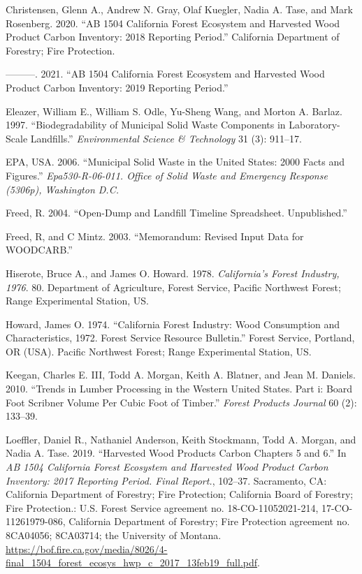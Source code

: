 \documentclass[
  openany]{book}
\newlength{\cslhangindent}
\newlength{\cslentryspacingunit} %
\newenvironment{CSLReferences}[2] %
 {%
  \setlength{\parindent}{0pt}
  \ifodd #1
  \let\oldpar\par
  \def\par{\hangindent=\cslhangindent\oldpar}
  \fi
  \setlength{\parskip}{#2\cslentryspacingunit}
 }%
 {}
\begin{document}
\begin{CSLReferences}{1}{0}
\leavevmode{}%
Christensen, Glenn A., Andrew N. Gray, Olaf Kuegler, Nadia A. Tase, and
Mark Rosenberg. 2020. {``AB 1504 California Forest Ecosystem and
Harvested Wood Product Carbon Inventory: 2018 Reporting Period.''}
California Department of Forestry; Fire Protection.

\leavevmode{}%
---------. 2021. {``AB 1504 California Forest Ecosystem and Harvested
Wood Product Carbon Inventory: 2019 Reporting Period.''}

\leavevmode{}%
Eleazer, William E., William S. Odle, Yu-Sheng Wang, and Morton A.
Barlaz. 1997. {``Biodegradability of Municipal Solid Waste Components in
Laboratory-Scale Landfills.''} \emph{Environmental Science \&
Technology} 31 (3): 911--17.

\leavevmode{}%
EPA, USA. 2006. {``Municipal Solid Waste in the United States: 2000
Facts and Figures.''} \emph{Epa530-R-06-011. Office of Solid Waste and
Emergency Response (5306p), Washington D.C.}

\leavevmode{}%
Freed, R. 2004. {``Open-Dump and Landfill Timeline Spreadsheet.
Unpublished.''}

\leavevmode{}%
Freed, R, and C Mintz. 2003. {``Memorandum: Revised Input Data for
WOODCARB.''}

\leavevmode{}%
Hiserote, Bruce A., and James O. Howard. 1978. \emph{California's Forest
Industry, 1976}. 80. Department of Agriculture, Forest Service, Pacific
Northwest Forest; Range Experimental Station, US.

\leavevmode{}%
Howard, James O. 1974. {``California Forest Industry: Wood Consumption
and Characteristics, 1972. Forest Service Resource Bulletin.''} Forest
Service, Portland, OR (USA). Pacific Northwest Forest; Range
Experimental Station, US.

\leavevmode{}%
Keegan, Charles E. III, Todd A. Morgan, Keith A. Blatner, and Jean M.
Daniels. 2010. {``Trends in Lumber Processing in the Western United
States. Part i: Board Foot Scribner Volume Per Cubic Foot of Timber.''}
\emph{Forest Products Journal} 60 (2): 133--39.

\leavevmode{}%
Loeffler, Daniel R., Nathaniel Anderson, Keith Stockmann, Todd A.
Morgan, and Nadia A. Tase. 2019. {``Harvested Wood Products Carbon
Chapters 5 and 6.''} In \emph{AB 1504 California Forest Ecosystem and
Harvested Wood Product Carbon Inventory: 2017 Reporting Period. Final
Report.}, 102--37. Sacramento, CA: California Department of Forestry;
Fire Protection; California Board of Forestry; Fire Protection.: U.S.
Forest Service agreement no. 18-CO-11052021-214, 17-CO-11261979-086,
California Department of Forestry; Fire Protection agreement no.
8CA04056; 8CA03714; the University of Montana.
\url{https://bof.fire.ca.gov/media/8026/4-final_1504_forest_ecosys_hwp_c_2017_13feb19_full.pdf}.


\end{CSLReferences}
\end{document}
